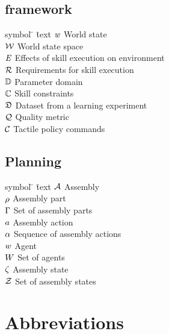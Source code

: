 \subsection*{\skillmodelabbr{} framework}
\begin{tabbing}
symbol \= \hspace{1.5cm} \= text \kill
$\mathit{w}$ \> \> World state \\[1.1ex]
$\mathcal{W}$ \> \> World state space \\[1.1ex]
$\mathit{E}$ \> \> Effects of skill execution on environment \\[1.1ex]
$\mathcal{R}$ \> \> Requirements for skill execution \\[1.1ex]
$\mathbb{D}$ \> \> Parameter domain \\[1.1ex]
$\mathbb{C}$ \> \> Skill constraints \\[1.1ex]
$\mathfrak{D}$ \> \> Dataset from a learning experiment \\[1.1ex]
$\mathcal{Q}$ \> \> Quality metric \\[1.1ex]
$\mathcal{C}$ \> \> Tactile policy commands \\[1.1ex]
\end{tabbing}
\subsection*{Planning}
\begin{tabbing}
symbol \= \hspace{1.5cm} \= text \kill
$\mathcal{A}$ \> \> Assembly \\[1.1ex]
$\rho$ \> \> Assembly part \\[1.1ex]
$\Gamma$ \> \> Set of assembly parts \\[1.1ex]
$a$ \> \> Assembly action \\[1.1ex]
$\alpha$ \> \> Sequence of assembly actions \\[1.1ex]
$w$ \> \> Agent \\[1.1ex]
$W$ \> \> Set of agents \\[1.1ex]
$\zeta$ \> \> Assembly state \\[1.1ex]
$\mathcal{Z}$ \> \> Set of assembly states \\[1.1ex]

%
\end{tabbing}

\section*{Abbreviations}

